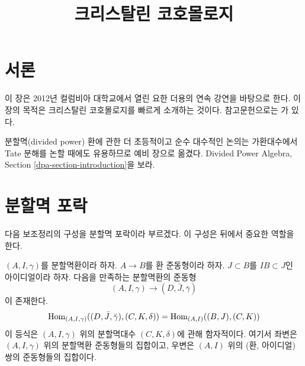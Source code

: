 

%


\title{크리스탈린 코호몰로지}


\maketitle

\label{section-phantom}

\tableofcontents



\section{서론}
\label{section-introduction}

\noindent
이 장은 2012년 컬럼비아 대학교에서 열린 요한 더용의 연속 강연을 바탕으로 한다.
이 장의 목적은 크리스탈린 코호몰로지를 빠르게 소개하는 것이다.
참고문헌으로는 \cite{Berthelot}가 있다.

\medskip\noindent
분할멱(divided power) 환에 관한 더 초등적이고 순수 대수적인 논의는 가환대수에서
Tate 분해를 논할 때에도 유용하므로 예비 장으로 옮겼다.
Divided Power Algebra, Section \ref{dpa-section-introduction}을 보라.













\section{분할멱 포락}
\label{section-divided-power-envelope}

\noindent
다음 보조정리의 구성을 분할멱 포락이라 부르겠다.
이 구성은 뒤에서 중요한 역할을 한다.

\begin{lemma}
\label{lemma-divided-power-envelope}
$(A, I, \gamma)$를 분할멱환이라 하자.
$A \to B$를 환 준동형이라 하자. $J \subset B$를 $IB \subset J$인
아이디얼이라 하자. 다음을 만족하는 분할멱환의 준동형
$$
(A, I, \gamma) \longrightarrow (D, \bar J, \bar \gamma)
$$
이 존재한다.
$$
\mathop{\mathrm{Hom}}\nolimits_{(A, I, \gamma)}((D, \bar J, \bar \gamma), (C, K, \delta)) =
\mathop{\mathrm{Hom}}\nolimits_{(A, I)}((B, J), (C, K))
$$
이 등식은 $(A, I, \gamma)$ 위의 분할멱대수 $(C, K, \delta)$에 관해
함자적이다. 여기서 좌변은 $(A, I, \gamma)$ 위의 분할멱환 준동형들의
집합이고, 우변은 $(A, I)$ 위의 (환, 아이디얼) 쌍의 준동형들의 집합이다.
\end{lemma}

